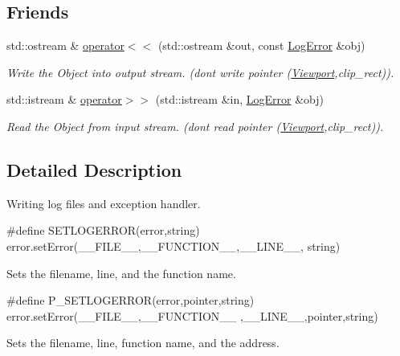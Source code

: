 \subsection*{Friends}
\begin{DoxyCompactItemize}
\item 
std::ostream \& \hyperlink{class_f2_c_1_1_log_error_a572bf2fc9d5712eecbab42ba4f0fe3b3}{operator$<$$<$} (std::ostream \&out, const \hyperlink{class_f2_c_1_1_log_error}{LogError} \&obj)
\begin{DoxyCompactList}\small\item\em Write the Object into output stream. (dont write pointer (\hyperlink{class_f2_c_1_1_viewport}{Viewport},clip\_\-rect)). \item\end{DoxyCompactList}\item 
std::istream \& \hyperlink{class_f2_c_1_1_log_error_a6fcf2a3199b92518fa70d937aea78aed}{operator$>$$>$} (std::istream \&in, \hyperlink{class_f2_c_1_1_log_error}{LogError} \&obj)
\begin{DoxyCompactList}\small\item\em Read the Object from input stream. (dont read pointer (\hyperlink{class_f2_c_1_1_viewport}{Viewport},clip\_\-rect)). \item\end{DoxyCompactList}\end{DoxyCompactItemize}


\subsection{Detailed Description}
Writing log files and exception handler. \par
 
\begin{DoxyCode}
 #define SETLOGERROR(error,string) error.setError(__FILE__,__FUNCTION__,__LINE__,
      string) 
\end{DoxyCode}
 Sets the filename, line, and the function name. \par
 
\begin{DoxyCode}
 #define P_SETLOGERROR(error,pointer,string) error.setError(__FILE__,__FUNCTION__
      ,__LINE__,pointer,string) 
\end{DoxyCode}
 Sets the filename, line, function name, and the address. 

